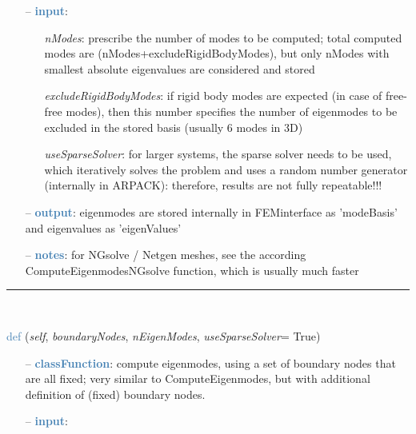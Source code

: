 \begin{itemize}[leftmargin=1.4cm]
\begin{itemize}[leftmargin=1.4cm]
\begin{itemize}[leftmargin=1.4cm]
\begin{itemize}[leftmargin=0.5cm]
\begin{itemize}[leftmargin=1.4cm]
\begin{itemize}[leftmargin=1.4cm]
\begin{itemize}[leftmargin=0.5cm]
\begin{itemize}[leftmargin=0.7cm]
\item[--]\textcolor{steelblue}{\bf input}: \vspace{-6pt}
\begin{itemize}[leftmargin=1.2cm]
\setlength{\itemindent}{-0.7cm}
\item[]{\it nModes}: prescribe the number of modes to be computed; total computed modes are  (nModes+excludeRigidBodyModes), but only nModes with smallest absolute eigenvalues are considered and stored
\item[]{\it excludeRigidBodyModes}: if rigid body modes are expected (in case of free-free modes), then this number specifies the number of eigenmodes to be excluded in the stored basis (usually 6 modes in 3D)
\item[]{\it useSparseSolver}: for larger systems, the sparse solver needs to be used, which iteratively solves the problem and uses a random number generator (internally in ARPACK): therefore, results are not fully repeatable!!!
\end{itemize}
\item[--]\textcolor{steelblue}{\bf output}: eigenmodes are stored internally in FEMinterface as 'modeBasis' and eigenvalues as 'eigenValues'
\item[--]\textcolor{steelblue}{\bf notes}: for NGsolve / Netgen meshes, see the according ComputeEigenmodesNGsolve function, which is usually much faster
\vspace{12pt}\end{itemize}
%
\noindent\rule{8cm}{0.75pt}\vspace{1pt} \\ 
\begin{flushleft}
\noindent \textcolor{steelblue}{def {\bf {}}}\label{sec:FEM:FEMinterface:ComputeEigenModesWithBoundaryNodes}
({\it self}, {\it boundaryNodes}, {\it nEigenModes}, {\it useSparseSolver}= True)
\end{flushleft}
\setlength{\itemindent}{0.7cm}
\begin{itemize}[leftmargin=0.7cm]
\item[--]\textcolor{steelblue}{\bf classFunction}: compute eigenmodes, using a set of boundary nodes that are all fixed; very similar to ComputeEigenmodes, but with additional definition of (fixed) boundary nodes.
\item[--]\textcolor{steelblue}{\bf input}: \vspace{-6pt}
\begin{itemize}[leftmargin=1.2cm]

\end{itemize}
\end{itemize}
\end{itemize}
\end{itemize}
\end{itemize}
\end{itemize}
\end{itemize}
\end{itemize}
\end{itemize}
